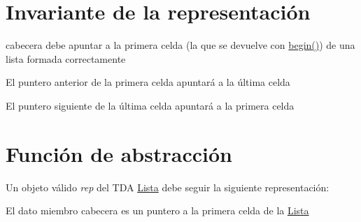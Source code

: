 \hypertarget{repLista_invLista}{}\section{Invariante de la representación}\label{repLista_invLista}

\begin{DoxyItemize}
\item cabecera debe apuntar a la primera celda (la que se devuelve con \mbox{\hyperlink{classLista_af73b5f5eb9e67ae9d1346f045d648d0c}{begin()}}) de una lista formada correctamente
\item El puntero anterior de la primera celda apuntará a la última celda
\item El puntero siguiente de la última celda apuntará a la primera celda 
\end{DoxyItemize}\hypertarget{repLista_faLista}{}\section{Función de abstracción}\label{repLista_faLista}
Un objeto válido {\itshape rep} del T\+DA \mbox{\hyperlink{classLista}{Lista}} debe seguir la siguiente representación\+:
\begin{DoxyItemize}
\item El dato miembro cabecera es un puntero a la primera celda de la \mbox{\hyperlink{classLista}{Lista}} 
\end{DoxyItemize}